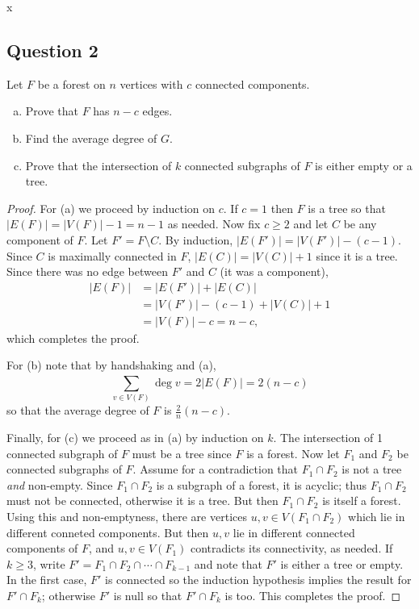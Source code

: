 x
\subsection{Question 2}

Let \( F \) be a forest on \( n \) vertices with \( c \) connected components. 
\begin{enumerate}[(a), leftmargin=1cm]
	\item Prove that \( F \) has \( n - c \) edges.
	\item Find the average degree of \( G \).
	\item Prove that the intersection of \( k \) connected subgraphs of \( F \) is either empty or a tree.
\end{enumerate}
\begin{proof} For (a) we proceed by induction on \( c \). If \( c = 1 \) then \( F \) is a tree so that \( |E(F)| = |V(F)| - 1 = n - 1 \) as needed. Now fix \( c \geq 2 \) and let \( C \) be any component of \( F \). Let \( F' = F \setminus C \). By induction, \( |E(F')| = |V(F')| - (c - 1) \). Since \( C \) is maximally connected in \( F \), \( |E(C)| = |V(C)| + 1 \) since it is a tree. Since there was no edge between \( F' \) and \( C \) (it was a component),
	\begin{align*}
		|E(F)| &= |E(F')| + |E(C)| \\
		       &= |V(F')| - (c - 1) + |V(C)| + 1 \\
		       &= |V(F)| - c = n - c,
	\end{align*}
	which completes the proof.

For (b) note that by handshaking and (a), \[ \sum_{v \in V(F)}^{} \deg v = 2 |E(F)| = 2(n - c)  \] so that the average degree of \( F \) is \(\frac{2}{n} (n-c).\)

Finally, for (c) we proceed as in (a) by induction on \( k \). The intersection of 1 connected subgraph of \( F \) must be a tree since \( F \) is a forest. Now let \( F_1 \) and \( F_2 \) be connected subgraphs of \( F \). Assume for a contradiction that \( F_1 \cap F_2 \) is not a tree \emph{and} non-empty. Since \( F_1 \cap F_2 \) is a subgraph of a forest, it is acyclic; thus \( F_1 \cap F_2 \) must not be connected, otherwise it is a tree. But then \( F_1 \cap F_2 \) is itself a forest. Using this and non-emptyness, there are vertices \( u,v \in V(F_1 \cap F_2) \) which lie in different conneted components. But then \( u,v \) lie in different connected components of \( F \), and \( u,v \in V(F_1) \) contradicts its connectivity, as needed. If \( k \geq 3 \), write \( F' = F_1 \cap F_2 \cap \cdots \cap F_{k-1}  \) and note that \( F' \) is either a tree or empty. In the first case, \( F' \) is connected so the induction hypothesis implies the result for \( F' \cap F_{k}  \); otherwise \( F' \) is null so that \( F' \cap F_{k}  \) is too. This completes the proof.
\end{proof}
